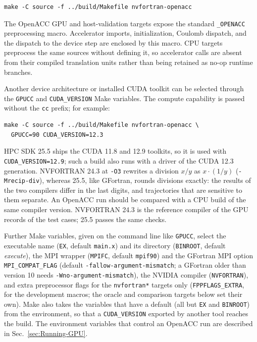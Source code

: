 \begin{verbatim}
make -C source -f ../build/Makefile nvfortran-openacc
\end{verbatim}

The OpenACC GPU and host-validation targets expose the standard
\texttt{\_OPENACC} preprocessing macro.
Accelerator imports, initialization, Coulomb dispatch, and the dispatch to
the device step are enclosed by this macro. CPU targets preprocess the same sources
without defining it, so accelerator calls are absent from their compiled
translation units rather than being retained as no-op runtime branches.

Another device architecture or installed CUDA toolkit can be selected through
the \texttt{GPUCC} and \texttt{CUDA\_VERSION} Make variables. The
compute capability is passed without the \texttt{cc} prefix; for example:

\begin{verbatim}
make -C source -f ../build/Makefile nvfortran-openacc \
  GPUCC=90 CUDA_VERSION=12.3
\end{verbatim}

HPC SDK 25.5 ships the CUDA 11.8 and 12.9 toolkits, so it is used with
\texttt{CUDA\_VERSION=12.9}; such a build also runs with a driver of the
CUDA 12.3 generation. NVFORTRAN 24.3 at \texttt{-O3} rewrites a division
$x/y$ as $x\cdot(1/y)$ (\texttt{-Mrecip-div}), whereas 25.5, like GFortran,
rounds divisions exactly: the results of the two compilers differ in the
last digits, and trajectories that are sensitive to them separate. An
OpenACC run should be compared with a CPU build of the same compiler
version. NVFORTRAN 24.3 is the reference compiler of the GPU records of
the test cases; 25.5 passes the same checks.

Further Make variables, given on the command line like \texttt{GPUCC},
select the executable name (\texttt{EX}, default \texttt{main.x}) and its
directory (\texttt{BINROOT}, default \textit{execute}), the MPI wrapper
(\texttt{MPIFC}, default \texttt{mpif90}) and the GFortran MPI option
\texttt{MPI\_COMPAT\_FLAG} (default \texttt{-fallow-argument-mismatch};
a GFortran older than version 10 needs \texttt{-Wno-argument-mismatch}),
the NVIDIA compiler (\texttt{NVFORTRAN}), and extra preprocessor flags for
the \texttt{nvfortran*} targets only (\texttt{FPPFLAGS\_EXTRA}, for the
development macros; the oracle and comparison targets below set their
own). Make also takes the variables that have a default (all but
\texttt{EX} and \texttt{BINROOT}) from the environment, so that a
\texttt{CUDA\_VERSION} exported by another tool reaches the build. The
environment variables that control an OpenACC run are described in
Sec.~\ref{sec:Running-GPU}.

